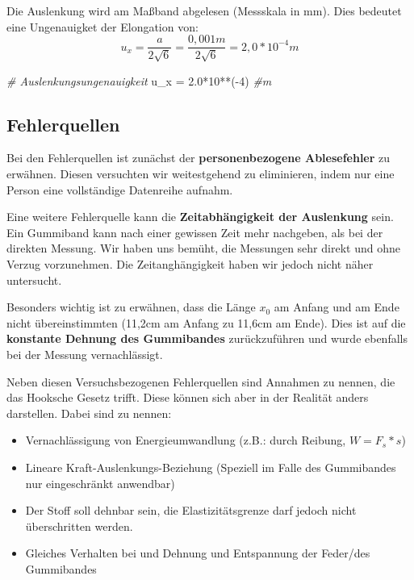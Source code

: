 \documentclass[
  9pt,
]{article}
\newenvironment{Shaded}{\begin{snugshade}}{\end{snugshade}}
\newcommand{\CommentTok}[1]{\textcolor[rgb]{0.56,0.35,0.01}{\textit{#1}}}
\newcommand{\DecValTok}[1]{\textcolor[rgb]{0.00,0.00,0.81}{#1}}
\newcommand{\FloatTok}[1]{\textcolor[rgb]{0.00,0.00,0.81}{#1}}
\newcommand{\NormalTok}[1]{#1}
\newcommand{\OtherTok}[1]{\textcolor[rgb]{0.56,0.35,0.01}{#1}}
\newcommand{\SpecialCharTok}[1]{\textcolor[rgb]{0.00,0.00,0.00}{#1}}
\providecommand{\tightlist}{%
  \setlength{\itemsep}{0pt}\setlength{\parskip}{0pt}}
\begin{document}
Die Auslenkung wird am Maßband abgelesen (Messskala in mm). Dies
bedeutet eine Ungenauigket der Elongation von:
\[u_{x}=\frac{a}{2\sqrt{6}}= \frac{0,001m}{2\sqrt{6}}=2,0*10^{-4}m\]

\begin{Shaded}
\begin{Highlighting}[]
\CommentTok{\# Auslenkungsungenauigkeit }
\NormalTok{u\_x }\OtherTok{=} \FloatTok{2.0}\SpecialCharTok{*}\DecValTok{10}\SpecialCharTok{**}\NormalTok{(}\SpecialCharTok{{-}}\DecValTok{4}\NormalTok{) }\CommentTok{\#m}
\end{Highlighting}
\end{Shaded}

\hypertarget{fehlerquellen}{%
\subsection{Fehlerquellen}\label{fehlerquellen}}

Bei den Fehlerquellen ist zunächst der \textbf{personenbezogene
Ablesefehler} zu erwähnen. Diesen versuchten wir weitestgehend zu
eliminieren, indem nur eine Person eine vollständige Datenreihe aufnahm.

Eine weitere Fehlerquelle kann die \textbf{Zeitabhängigkeit der
Auslenkung} sein. Ein Gummiband kann nach einer gewissen Zeit mehr
nachgeben, als bei der direkten Messung. Wir haben uns bemüht, die
Messungen sehr direkt und ohne Verzug vorzunehmen. Die Zeitanghängigkeit
haben wir jedoch nicht näher untersucht.

Besonders wichtig ist zu erwähnen, dass die Länge \(x_0\) am Anfang und
am Ende nicht übereinstimmten (11,2cm am Anfang zu 11,6cm am Ende). Dies
ist auf die \textbf{konstante Dehnung des Gummibandes} zurückzuführen
und wurde ebenfalls bei der Messung vernachlässigt.

Neben diesen Versuchsbezogenen Fehlerquellen sind Annahmen zu nennen,
die das Hooksche Gesetz trifft. Diese können sich aber in der Realität
anders darstellen. Dabei sind zu nennen:

\begin{itemize}
\tightlist
\item
  Vernachlässigung von Energieumwandlung (z.B.: durch Reibung,
  \(W=F_s*s\))
\item
  Lineare Kraft-Auslenkungs-Beziehung (Speziell im Falle des Gummibandes
  nur eingeschränkt anwendbar)
\item
  Der Stoff soll dehnbar sein, die Elastizitätsgrenze darf jedoch nicht
  überschritten werden.
\item
  Gleiches Verhalten bei und Dehnung und Entspannung der Feder/des
  Gummibandes
\end{itemize}
\end{document}
